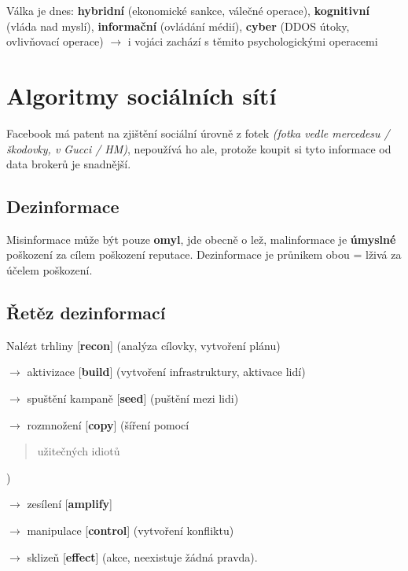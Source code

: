 \vspace{4pt}
\noindent Válka je dnes: \textbf{hybridní} (ekonomické sankce, válečné operace), \textbf{kognitivní} (vláda nad myslí), \textbf{informační} (ovládání médií), \textbf{cyber} (DDOS útoky, ovlivňovací operace) $\to$ i vojáci zachází s těmito psychologickými operacemi


\section{Algoritmy sociálních sítí}

Facebook má patent na zjištění sociální úrovně z fotek \textit{(fotka vedle mercedesu / škodovky, v Gucci / HM)}, nepoužívá ho ale, protože koupit si tyto informace od data brokerů je snadnější.

\subsection{Dezinformace}

Misinformace může být pouze \textbf{omyl}, jde obecně o lež, malinformace je \textbf{úmyslné} poškození za cílem poškození reputace. Dezinformace je průnikem obou = lživá za účelem poškození.

\subsection{Řetěz dezinformací}
Nalézt trhliny [\textbf{recon}] (analýza cílovky, vytvoření plánu)

\vspace{2pt}
\noindent $\to$ aktivizace [\textbf{build}] (vytvoření infrastruktury, aktivace lidí)

\vspace{2pt}
\noindent $\to$ spuštění kampaně [\textbf{seed}] (puštění mezi lidi)

\vspace{2pt}
\noindent $\to$ rozmnožení [\textbf{copy}] (šíření pomocí \blockquote{užitečných idiotů})

\vspace{2pt}
\noindent $\to$ zesílení [\textbf{amplify}]

\vspace{2pt}
\noindent $\to$ manipulace [\textbf{control}] (vytvoření konfliktu)

\vspace{2pt}
\noindent $\to$ sklizeň [\textbf{effect}] (akce, neexistuje žádná pravda).

